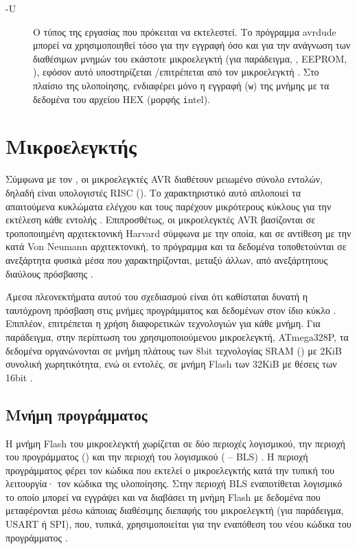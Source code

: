 \begin{enumerate}
\begin{description}
        \item[-U] Ο τύπος της εργασίας που πρόκειται να εκτελεστεί. Το πρόγραμμα
        avrdude μπορεί να χρησιμοποιηθεί τόσο για την εγγραφή όσο και για την
        ανάγνωση των διαθέσιμων μνημών του εκάστοτε μικροελεγκτή (για
        παράδειγμα, , EEPROM, ), εφόσον αυτό υποστηρίζεται%
        \slash{}επιτρέπεται από τον μικροελεγκτή \parencite{avrdude}. Στο
        πλαίσιο της υλοποίησης, ενδιαφέρει μόνο η εγγραφή (\verb~w~) της μνήμης
         με τα δεδομένα του αρχείου HEX (μορφής \verb~i~ntel).
    \end{description}

\end{enumerate}


\section{Μικροελεγκτής}

Σύμφωνα με τον \textcite[1]{myklebust97}, οι μικροελεγκτές AVR διαθέτουν
μειωμένο σύνολο εντολών, δηλαδή είναι υπολογιστές RISC (). Το χαρακτηριστικό αυτό απλοποιεί τα απαιτούμενα κυκλώματα
ελέγχου και τους παρέχουν μικρότερους κύκλους για την εκτέλεση κάθε εντολής
\parencite[1]{sequin82}. Επιπροσθέτως, οι μικροελεγκτές AVR βασίζονται σε
τροποποιημένη αρχιτεκτονική Harvard σύμφωνα με την οποία, και σε αντίθεση με την
κατά Von Neumann αρχιτεκτονική, το πρόγραμμα και τα δεδομένα τοποθετούνται σε
ανεξάρτητα φυσικά μέσα που χαρακτηρίζονται, μεταξύ άλλων, από ανεξάρτητους
διαύλους πρόσβασης \parencite[1]{myklebust97}.

Άμεσα πλεονεκτήματα αυτού του σχεδιασμού είναι ότι καθίσταται δυνατή η
ταυτόχρονη πρόσβαση στις μνήμες προγράμματος και δεδομένων στον ίδιο κύκλο
\parencite[8]{atmel13}. Επιπλέον, επιτρέπεται η χρήση διαφορετικών τεχνολογιών
για κάθε μνήμη. Για παράδειγμα, στην περίπτωση του χρησιμοποιούμενου
μικροελεγκτή, ATmega328P, τα δεδομένα οργανώνονται σε μνήμη πλάτους των 8bit
τεχνολογίας SRAM () με 2KiB συνολική χωρητικότητα, ενώ οι
εντολές, σε μνήμη Flash των 32KiB με θέσεις των 16bit
\parencite[8--9,16,18]{atmel13}.


\subsection{Μνήμη προγράμματος}
\label{subsec:avr:progmem}

Η μνήμη Flash του μικροελεγκτή χωρίζεται σε δύο περιοχές λογισμικού, την περιοχή
του προγράμματος () και την περιοχή του λογισμικού
 ( -- BLS) \parencite[269]{atmel13}.
Η περιοχή προγράμματος φέρει τον κώδικα που εκτελεί ο μικροελεγκτής κατά την
τυπική του λειτουργία· τον κώδικα της υλοποίησης. Στην περιοχή BLS εναποτίθεται
λογισμικό το οποίο μπορεί να εγγράψει και να διαβάσει τη μνήμη Flash με δεδομένα
που μεταφέρονται μέσω κάποιας διαθέσιμης διεπαφής του μικροελεγκτή (για
παράδειγμα, USART ή SPI), που, τυπικά, χρησιμοποιείται για την εναπόθεση του
νέου κώδικα του προγράμματος \parencite[269,273]{atmel13}.

